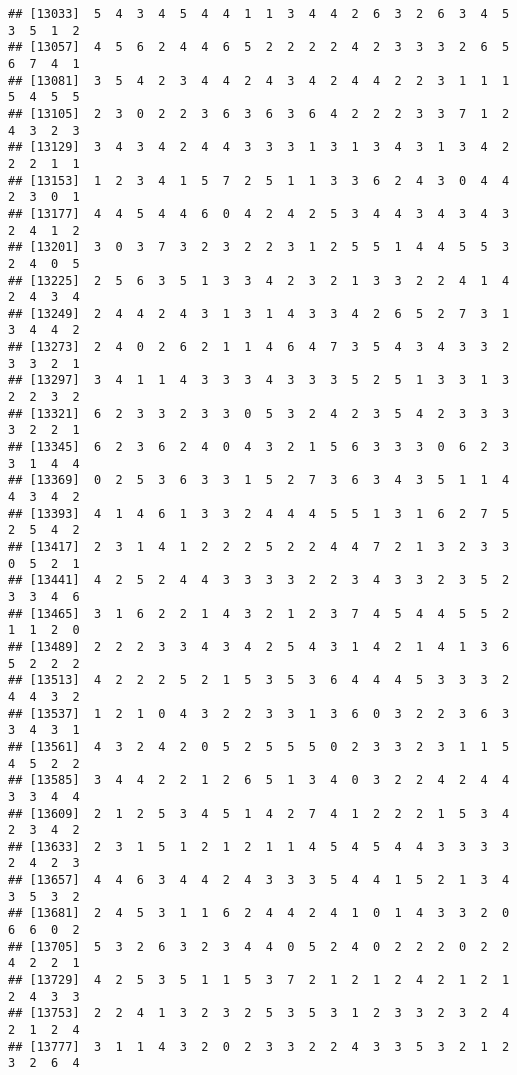 \documentclass[
]{article}
\begin{document}
\begin{verbatim}
## [13033]  5  4  3  4  5  4  4  1  1  3  4  4  2  6  3  2  6  3  4  5  3  5  1  2
## [13057]  4  5  6  2  4  4  6  5  2  2  2  2  4  2  3  3  3  2  6  5  6  7  4  1
## [13081]  3  5  4  2  3  4  4  2  4  3  4  2  4  4  2  2  3  1  1  1  5  4  5  5
## [13105]  2  3  0  2  2  3  6  3  6  3  6  4  2  2  2  3  3  7  1  2  4  3  2  3
## [13129]  3  4  3  4  2  4  4  3  3  3  1  3  1  3  4  3  1  3  4  2  2  2  1  1
## [13153]  1  2  3  4  1  5  7  2  5  1  1  3  3  6  2  4  3  0  4  4  2  3  0  1
## [13177]  4  4  5  4  4  6  0  4  2  4  2  5  3  4  4  3  4  3  4  3  2  4  1  2
## [13201]  3  0  3  7  3  2  3  2  2  3  1  2  5  5  1  4  4  5  5  3  2  4  0  5
## [13225]  2  5  6  3  5  1  3  3  4  2  3  2  1  3  3  2  2  4  1  4  2  4  3  4
## [13249]  2  4  4  2  4  3  1  3  1  4  3  3  4  2  6  5  2  7  3  1  3  4  4  2
## [13273]  2  4  0  2  6  2  1  1  4  6  4  7  3  5  4  3  4  3  3  2  3  3  2  1
## [13297]  3  4  1  1  4  3  3  3  4  3  3  3  5  2  5  1  3  3  1  3  2  2  3  2
## [13321]  6  2  3  3  2  3  3  0  5  3  2  4  2  3  5  4  2  3  3  3  3  2  2  1
## [13345]  6  2  3  6  2  4  0  4  3  2  1  5  6  3  3  3  0  6  2  3  3  1  4  4
## [13369]  0  2  5  3  6  3  3  1  5  2  7  3  6  3  4  3  5  1  1  4  4  3  4  2
## [13393]  4  1  4  6  1  3  3  2  4  4  4  5  5  1  3  1  6  2  7  5  2  5  4  2
## [13417]  2  3  1  4  1  2  2  2  5  2  2  4  4  7  2  1  3  2  3  3  0  5  2  1
## [13441]  4  2  5  2  4  4  3  3  3  3  2  2  3  4  3  3  2  3  5  2  3  3  4  6
## [13465]  3  1  6  2  2  1  4  3  2  1  2  3  7  4  5  4  4  5  5  2  1  1  2  0
## [13489]  2  2  2  3  3  4  3  4  2  5  4  3  1  4  2  1  4  1  3  6  5  2  2  2
## [13513]  4  2  2  2  5  2  1  5  3  5  3  6  4  4  4  5  3  3  3  2  4  4  3  2
## [13537]  1  2  1  0  4  3  2  2  3  3  1  3  6  0  3  2  2  3  6  3  3  4  3  1
## [13561]  4  3  2  4  2  0  5  2  5  5  5  0  2  3  3  2  3  1  1  5  4  5  2  2
## [13585]  3  4  4  2  2  1  2  6  5  1  3  4  0  3  2  2  4  2  4  4  3  3  4  4
## [13609]  2  1  2  5  3  4  5  1  4  2  7  4  1  2  2  2  1  5  3  4  2  3  4  2
## [13633]  2  3  1  5  1  2  1  2  1  1  4  5  4  5  4  4  3  3  3  3  2  4  2  3
## [13657]  4  4  6  3  4  4  2  4  3  3  3  5  4  4  1  5  2  1  3  4  3  5  3  2
## [13681]  2  4  5  3  1  1  6  2  4  4  2  4  1  0  1  4  3  3  2  0  6  6  0  2
## [13705]  5  3  2  6  3  2  3  4  4  0  5  2  4  0  2  2  2  0  2  2  4  2  2  1
## [13729]  4  2  5  3  5  1  1  5  3  7  2  1  2  1  2  4  2  1  2  1  2  4  3  3
## [13753]  2  2  4  1  3  2  3  2  5  3  5  3  1  2  3  3  2  3  2  4  2  1  2  4
## [13777]  3  1  1  4  3  2  0  2  3  3  2  2  4  3  3  5  3  2  1  2  3  2  6  4

\end{verbatim}
\end{document}
